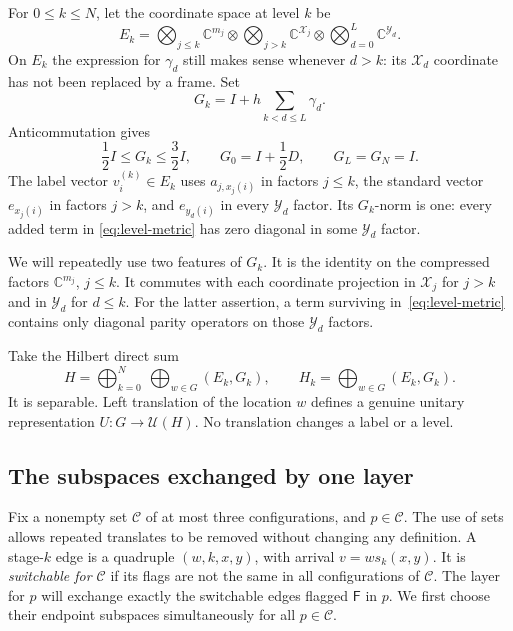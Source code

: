 \documentclass[11pt]{article}
\numberwithin{equation}{section}
\theoremstyle{definition}
\theoremstyle{remark}
\newcommand{\U}{\mathcal U}
\newcommand{\F}{\mathsf F}
\newcommand{\cX}{\mathcal X}
\newcommand{\cY}{\mathcal Y}
\newcommand{\cC}{\mathcal C}
\begin{document}
For $0\le k\le N$, let the coordinate space at level $k$ be
\[
 E_k=\bigotimes_{j\le k}\mathbb C^{m_j}
      \otimes\bigotimes_{j>k}\mathbb C^{\cX_j}
      \otimes\bigotimes_{d=0}^L\mathbb C^{\cY_d}.
\]
On $E_k$ the expression for $\gamma_d$ still makes sense whenever $d>k$:
its $\cX_d$ coordinate has not been replaced by a frame. Set
\begin{equation}\label{eq:level-metric}
 G_k=I+h\sum_{k<d\le L}\gamma_d.
\end{equation}
Anticommutation gives
\begin{equation}\label{eq:metric-bound}
 \frac12 I\le G_k\le\frac32 I,
 \qquad G_0=I+\frac12D,\qquad G_L=G_N=I.
\end{equation}
The label vector $v_i^{(k)}\in E_k$ uses $a_{j,x_j(i)}$ in factors $j\le k$,
the standard vector $e_{x_j(i)}$ in factors $j>k$, and $e_{y_d(i)}$ in every
$\cY_d$ factor. Its $G_k$-norm is one: every added term in
\eqref{eq:level-metric} has zero diagonal in some $\cY_d$ factor.

We will repeatedly use two features of $G_k$. It is the identity on the
compressed factors $\mathbb C^{m_j}$, $j\le k$. It commutes with each
coordinate projection in $\cX_j$ for $j>k$ and in $\cY_d$ for $d\le k$.
For the latter assertion, a term surviving in~\eqref{eq:level-metric}
contains only diagonal parity operators on those $\cY_d$ factors.

Take the Hilbert direct sum
\begin{equation}\label{eq:big-space}
 H=\bigoplus_{k=0}^N\ \bigoplus_{w\in G}(E_k,G_k),
 \qquad H_k=\bigoplus_{w\in G}(E_k,G_k).
\end{equation}
It is separable. Left translation of the location $w$ defines a genuine
unitary representation $U:G\to\U(H)$. No translation changes a label or
a level.

\subsection{The subspaces exchanged by one layer}
Fix a nonempty set $\cC$ of at most three configurations, and $p\in\cC$.
The use of sets allows repeated translates to be removed without changing
any definition. A stage-$k$ edge is a quadruple $(w,k,x,y)$, with arrival
$v=ws_k(x,y)$. It is \emph{switchable for $\cC$} if its flags are not the
same in all configurations of $\cC$.
The layer for $p$ will exchange exactly the switchable edges flagged $\F$
in $p$. We first choose their endpoint subspaces simultaneously for all
$p\in\cC$.
\end{document}
